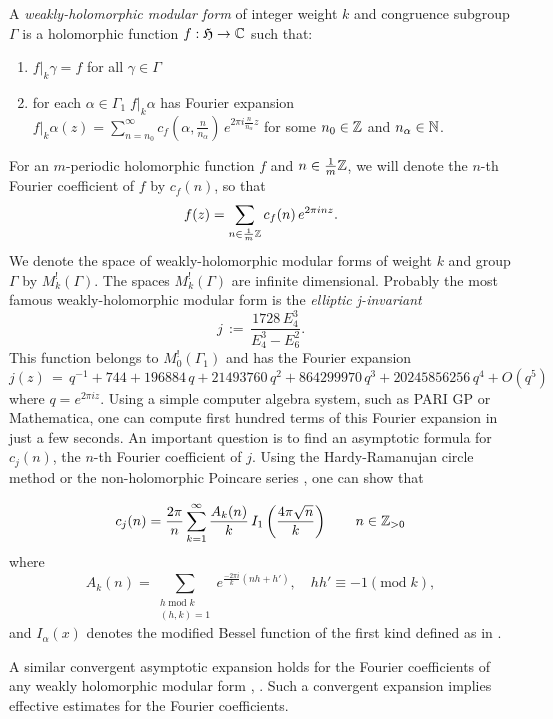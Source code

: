 \begin{definition}\label{def:weakly-holomorphic-modular-form}
A \emph{weakly-holomorphic modular form} of integer weight $k$ and congruence subgroup $\Gamma$ is a holomorphic function $f:\mathfrak{H}\to\mathbb{C}$ such that:
\begin{enumerate}
  \item $f|_k\gamma=f$ for all $\gamma\in\Gamma$
  \item for each $\alpha\in\Gamma_1\;f|_k\alpha$ has Fourier expansion $f|_k\alpha (z)=\sum_{n=n_0}^\infty c_f(\alpha,\frac{n}{n_\alpha})\,e^{2\pi i \frac{n}{n_\alpha}z}$ for some $n_0\in\mathbb{Z}$ and $n_\alpha\in\mathbb{N}$.
\end{enumerate}
\end{definition}
For an $m$-periodic holomorphic function $f$ and $n\in\frac 1m \mathbb{Z}$, we will denote the $n$-th Fourier coefficient of $f$ by $c_f(n)$, so that
$$f(z)=\sum_{n\in\frac 1m \mathbb{Z}} c_f(n)\,e^{2\pi i n z}.$$
We denote the space of weakly-holomorphic modular forms of weight $k$ and group $\Gamma$ by $M_k^!(\Gamma)$. The spaces $M_k^!(\Gamma)$ are infinite dimensional.
Probably the most famous weakly-holomorphic modular form is the \emph{elliptic j-invariant}
$$j\,:=\,\frac{1728\, E_4^3}{E_4^3-E_6^2}. $$
This function belongs to $M_0^!(\Gamma_1)$ and has the Fourier expansion
$$j(z)\,=\,q^{-1} + 744 + 196884\, q + 21493760\, q^2 + 864299970\, q^3 +
  20245856256\, q^4 + O(q^5) $$
where $q=e^{2\pi i z}$.
Using a simple computer algebra system, such as PARI GP or Mathematica, one can compute first hundred terms of this Fourier expansion in just a few seconds. An important question is to find an  asymptotic formula for $c_j(n)$, the $n$-th Fourier coefficient  of $j$. Using the Hardy-Ramanujan circle method \cite{Rademacher38} or the non-holomorphic Poincare series \cite{Petersson32}, one can show that
\begin{lemma}\label{lemma: j Fourier asymptotic}
\begin{equation}\label{eqn: j Fourier asymptotic}
c_j(n)=\frac{2\pi}{n}\sum_{k=1}^\infty \frac{A_k(n)}{k}\,I_1\left(\frac{4\pi \sqrt{n}}{k}\right)\qquad n\in\mathbb{Z}_{>0}\end{equation}
where
$$A_k(n)= \sum_{\substack{h\;\mathrm{mod}\;k\\(h,k)=1}} e^{\frac{-2\pi i}{k}(nh+h')},\quad hh'\equiv -1(\mbox{mod}\;k),$$
and $I_\alpha(x)$ denotes the modified Bessel function of the first kind defined as in \cite[Section~9.6]{Abramowitz}.
\end{lemma}
A similar convergent asymptotic expansion holds for the Fourier coefficients of any weakly holomorphic modular form \cite{Hejhal}, \cite[Propositions~1.10 and~1.12]{Bruinier}. Such a convergent expansion implies effective estimates for the Fourier coefficients.
